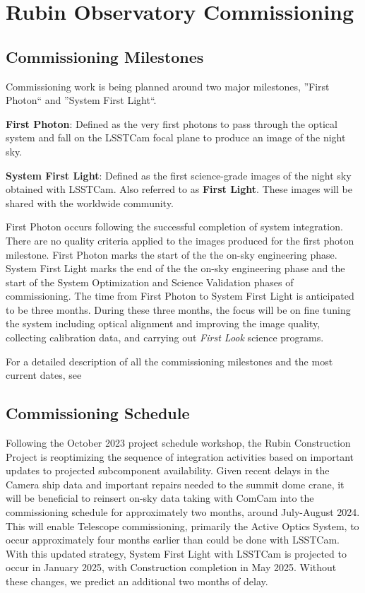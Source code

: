 \section{Rubin Observatory Commissioning}
\label{sec:commissioning}

\subsection{Commissioning Milestones}
\label{ssec:commissioning-milestones}

Commissioning work is being planned around two major milestones, ''First Photon`` and ''System First Light``. 

\textbf {First Photon}: Defined as the very first photons to pass through the optical system and fall on the LSSTCam focal plane to produce an image of the night sky.

\textbf {System First Light}: Defined as the first science-grade images of the night sky obtained with LSSTCam. 
Also referred to as \textbf{First Light}. 
These images will be shared with the worldwide community. 

First Photon occurs following the successful completion of system integration. 
There are no quality criteria applied to the images produced for the first photon milestone. 
First Photon  marks the start of the the on-sky engineering phase.
System First Light  marks the end of the the on-sky engineering phase and the start of the System Optimization and Science Validation phases of commissioning.
The time from First Photon to System First Light is anticipated to be three months.
During these three months, the focus will be on fine tuning the system including optical alignment and improving the image quality, collecting calibration data, and carrying out \textit{First Look} science programs. 

For a detailed description of all the commissioning milestones and the most current dates, see 

\subsection{Commissioning Schedule}
\label{ssec:commissioning-schedule}

Following the October 2023 project schedule workshop, the Rubin Construction Project is reoptimizing the sequence of integration activities based on important updates to projected subcomponent availability.
Given recent delays in the Camera ship data and important repairs needed to the summit dome crane, it will be beneficial to reinsert on-sky data taking with ComCam into the commissioning schedule for approximately two months, around July-August 2024. 
This will enable Telescope commissioning, primarily the Active Optics System, to occur approximately four months earlier than could be done with LSSTCam. 
With this updated strategy, System First Light with LSSTCam is projected to occur in January 2025, with Construction completion in May 2025.
Without these changes, we predict an additional two months of delay.

